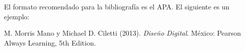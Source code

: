 
\newpage

El formato recomendado para la bibliograf\' ia es el APA. El siguiente es un ejemplo:

\begin{thebibliography}{}
 M. Morris Mano y Michael D. Ciletti (2013). \emph{Dise\~ no Digital}. M\' exico:  Pearson Always Learning, 5th Edition.

\end{thebibliography}

